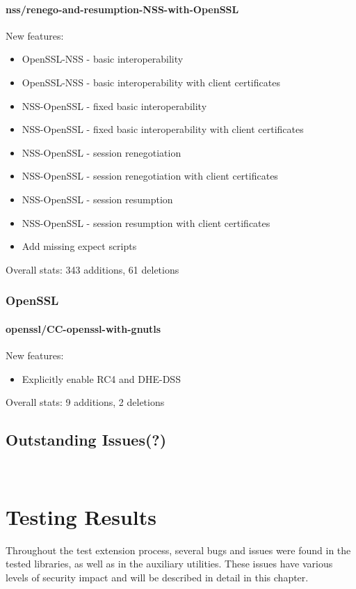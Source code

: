 \subsubsection{nss/renego-and-resumption-NSS-with-OpenSSL}
    New features:
    \begin{itemize}
        \item OpenSSL-NSS - basic interoperability
        \item OpenSSL-NSS - basic interoperability with client certificates
        \item NSS-OpenSSL - fixed basic interoperability
        \item NSS-OpenSSL - fixed basic interoperability with client
            certificates
        \item NSS-OpenSSL - session renegotiation
        \item NSS-OpenSSL - session renegotiation with client certificates
        \item NSS-OpenSSL - session resumption
        \item NSS-OpenSSL - session resumption with client certificates
        \item Add missing expect scripts
    \end{itemize}

    Overall stats: 343 additions, 61 deletions

\subsection{OpenSSL}
\subsubsection{openssl/CC-openssl-with-gnutls}
    New features:
    \begin{itemize}
        \item Explicitly enable RC4 and DHE-DSS
    \end{itemize}

    Overall stats: 9 additions, 2 deletions

\section{Outstanding Issues(?)}
     \\


\chapter {Testing Results} \label{chap:testing_results}
    Throughout the test extension process, several bugs and issues were found
    in the tested libraries, as well as in the auxiliary utilities. These
    issues have various levels of security impact and will be described in
    detail in this chapter.

